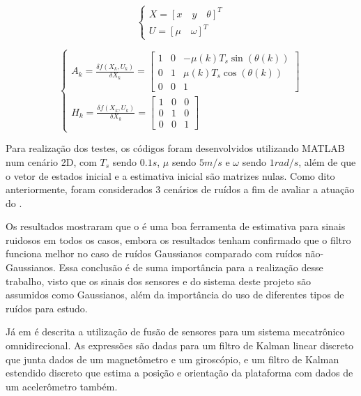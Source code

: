 \documentclass[acronym, symbols, table, deposito]{fei}
\begin{document}
\begin{equation}\label{eq:trab_relacionados_vetor_estados_1}
	\begin{cases}
		X = [x \quad y \quad \theta]^T \\
		U = [\mu \quad \omega]^T
	\end{cases}
\end{equation}

\begin{equation}\label{eq:trab_relacionados_matrizes_jacobianas}
	\begin{cases}
		A_k = \frac{\delta f(X_k, U_k)}{\delta X_k} = \begin{bmatrix}
			1 & 0 & -\mu(k)T_s\sin{(\theta(k))} \\
			0 & 1 & \mu(k)T_s\cos{(\theta(k))}  \\
			0 & 0 & 1
		\end{bmatrix} \\[30pt]
		
		H_k = \frac{\delta f(X_k, U_k)}{\delta X_k} = 
		\begin{bmatrix}
			1 & 0 & 0 \\
			0 & 1 & 0 \\
			0 & 0 & 1 
		\end{bmatrix}		
	\end{cases}
\end{equation}

Para realização dos testes, os códigos foram desenvolvidos utilizando MATLAB num cenário 2D, com $T_s$ sendo $0.1s$, $\mu$ sendo $5m/s$ e $\omega$ sendo $1rad/s$, além de que o vetor de estados inicial e a estimativa inicial são matrizes nulas. Como dito anteriormente, foram considerados 3 cenários de ruídos a fim de avaliar a atuação do .

Os resultados mostraram que o  é uma boa ferramenta de estimativa para sinais ruidosos em todos os casos, embora os resultados tenham confirmado que o filtro funciona melhor no caso de ruídos Gaussianos comparado com ruídos não-Gaussianos. Essa conclusão é de suma importância para a realização desse trabalho, visto que os sinais dos sensores e do sistema deste projeto são assumidos como Gaussianos, além da importância do uso de diferentes tipos de ruídos para estudo.

Já em \textcite{korotaj2021kalman} é descrita a utilização de fusão de sensores para um sistema mecatrônico omnidirecional. As expressões são dadas para um filtro de Kalman linear discreto que junta dados de um magnetômetro e um giroscópio, e um filtro de Kalman estendido discreto que estima a posição e orientação da plataforma com dados de um acelerômetro também.
\end{document}
